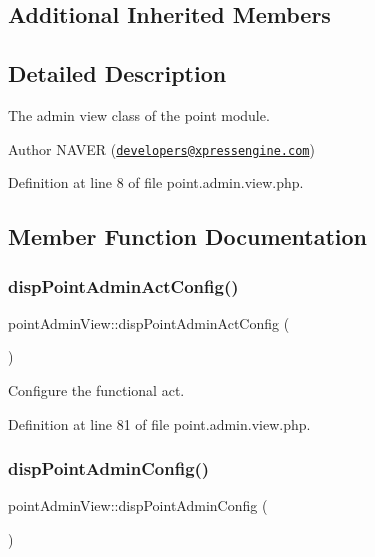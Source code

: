 \subsection*{Additional Inherited Members}


\subsection{Detailed Description}
The admin view class of the point module. 

\begin{DoxyAuthor}{Author}
N\+A\+V\+ER (\href{mailto:developers@xpressengine.com}{\tt developers@xpressengine.\+com}) 
\end{DoxyAuthor}


Definition at line 8 of file point.\+admin.\+view.\+php.



\subsection{Member Function Documentation}
\mbox{\label{classpointAdminView_a26806618247648a89db0c1af0a02918e}} 
\subsubsection{\texorpdfstring{disp\+Point\+Admin\+Act\+Config()}{dispPointAdminActConfig()}}
{\footnotesize\ttfamily point\+Admin\+View\+::disp\+Point\+Admin\+Act\+Config (\begin{DoxyParamCaption}{ }\end{DoxyParamCaption})}



Configure the functional act. 



Definition at line 81 of file point.\+admin.\+view.\+php.

\mbox{\label{classpointAdminView_a5e73a90049fb98faea8d3074c513da31}} 
\subsubsection{\texorpdfstring{disp\+Point\+Admin\+Config()}{dispPointAdminConfig()}}
{\footnotesize\ttfamily point\+Admin\+View\+::disp\+Point\+Admin\+Config (\begin{DoxyParamCaption}{ }\end{DoxyParamCaption})}



